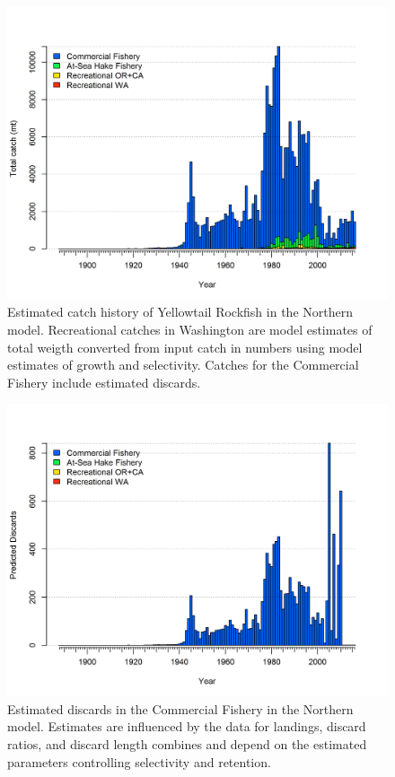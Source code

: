 \documentclass[12pt,]{article}
\begin{document}
\FloatBarrier

\begin{figure}[htbp]
\centering
\includegraphics{r4ss/plots_mod1/catch5 total catch (including discards) stacked.png}
\caption{Estimated catch history of Yellowtail Rockfish in the Northern
model. Recreational catches in Washington are model estimates of total
weigth converted from input catch in numbers using model estimates of
growth and selectivity. Catches for the Commercial Fishery include
estimated discards.\label{fig:r4ss_total_catch_N}}
\end{figure}

\begin{figure}[htbp]
\centering
\includegraphics{r4ss/plots_mod1/catch7 discards stacked plot (depends on multiple fleets).png}
\caption{Estimated discards in the Commercial Fishery in the Northern
model. Estimates are influenced by the data for landings, discard
ratios, and discard length combines and depend on the estimated
parameters controlling selectivity and
retention.\label{fig:r4ss_discard_N}}
\end{figure}
\end{document}
